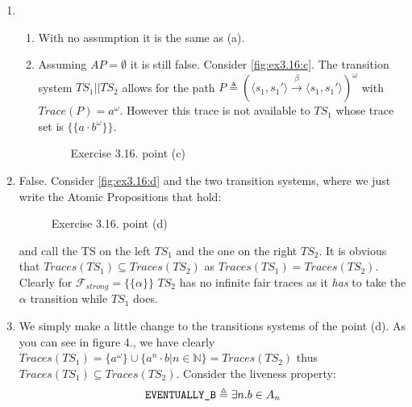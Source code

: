 \documentclass{article}
\begin{document}
\begin{enumerate}[label=(\alph*)]
		\item 
		\begin{enumerate}[label=\arabic*.]
			\item With no assumption it is the same as (a).
			\item Assuming $AP=\emptyset$ it is still false. Consider \autoref{fig:ex3.16:c}. The transition system $TS_1 || TS_2$ allows for the path $P \triangleq (\langle s_1, s_1'\rangle \overset{\beta}{\rightarrow} \langle s_1, s_1'\rangle)^\omega$ with $Trace(P)=a^{\omega}$. However this trace is not available to $TS_1$ whose trace set is $\{\{a\cdot b^{\omega}\}\}$.
			\begin{figure}[ht]
				\centering    
				\caption{Exercise 3.16. point (c)}
				\label{fig:ex3.16:c}
			\end{figure}
			
		\end{enumerate}
		\item False. Consider \autoref{fig:ex3.16:d} and the two transition systems, where we just write the Atomic Propositions that hold:
		\begin{figure}[ht]
			\centering    
			\caption{Exercise 3.16. point (d)}
			\label{fig:ex3.16:d}
		\end{figure}
		 and call the TS on the left $TS_1$ and the one on the right $TS_2$. It is obvious that $Traces(TS_1) \subseteq Traces(TS_2)$ as $Traces(TS_1) = Traces(TS_2)$.
		Clearly for $\mathcal{F}_{strong}=\{\{\alpha\}\}$ $TS_2$ has no infinite fair traces as it \textit{has} to take the $\alpha$ transition while $TS_1$ does.
		\item We simply make a little change to the transitions systems of the point (d). As you can see in figure 4., we have clearly $Traces(TS_1)=\{a^\omega\} \cup \{a^n\cdot b | n \in \mathbb{N}\}=Traces(TS_2)$ thus $Traces(TS_1)\subseteq Traces(TS_2)$.
		Consider the liveness property:
		$$
		\verb|EVENTUALLY_B| \triangleq \exists n. b \in A_n
		$$
		

\end{enumerate}
\end{document}
